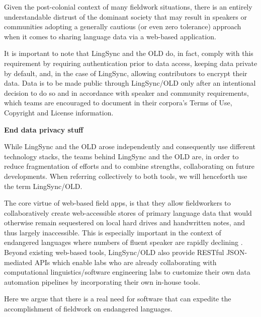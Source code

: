\documentclass[11pt]{article}
\begin{document}
Given the post-colonial context of many fieldwork situations, there
is an entirely understandable distrust of the dominant society that may result
in speakers or communities adopting a generally cautious (or even zero
tolerance) approach when it comes to sharing language data via a web-based
application.

It is important to note that LingSync and the OLD do, in fact, comply with this
requirement by requiring authentication prior to data access, keeping data
private by default, and, in the case of LingSync, allowing contributors to
encrypt their data. Data is to be made public through LingSync/OLD only after
an intentional decision to do so and in accordance with speaker and community
requirements, which teams are encouraged to document in their corpora's Terms of
Use, Copyright and License information.


\textbf{End data privacy stuff}



















While LingSync and the OLD arose independently and consequently use different
technology stacks, the teams behind LingSync and the OLD are, in order to
reduce fragmentation of efforts and to combine strengths, collaborating on
future developments. When referring collectively to both tools, we will
henceforth use the term LingSync/OLD.

The core virtue of web-based field apps, is that they allow fieldworkers to
collaboratively create web-accessible stores of primary language data that
would otherwise remain sequestered on local hard drives and handwritten notes,
and thus largely inaccessible. This is especially important in the context of
endangered languages where numbers of fluent speaker are rapidly declining
\cite{fphlcc10}. Beyond existing web-based tools, LingSync/OLD also
provide RESTful JSON-mediated APIs which enable labs who are already
collaborating with computational linguistics/software engineering labs to
customize their own data automation pipelines by incorporating their own
in-house tools.



Here we argue that there is a real need for software that can expedite the 
accomplishment of fieldwork on endangered languages.
\end{document}
